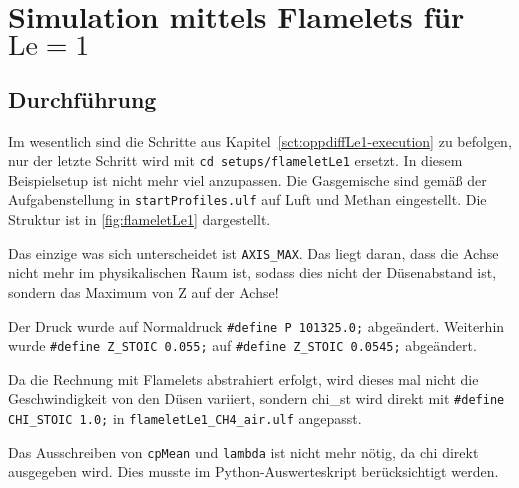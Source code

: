 
\section{Simulation mittels Flamelets für \texorpdfstring{$\mathrm{Le}=1$}{Le=1}}
\label{sct:flameletLe=1}

\subsection{Durchführung}
\label{sct:flameletLe1-execution}

\begin{sloppypar} %
Im wesentlich sind die Schritte aus Kapitel~\ref{sct:oppdiffLe1-execution} zu befolgen, nur der letzte Schritt wird mit \lstinline!cd setups/flameletLe1! ersetzt. In diesem Beispielsetup ist nicht mehr viel anzupassen. Die Gasgemische sind gemäß der Aufgabenstellung in \lstinline!startProfiles.ulf! auf Luft und Methan eingestellt. Die Struktur ist in \autoref{fig:flameletLe1} dargestellt.
\end{sloppypar}

Das einzige was sich unterscheidet ist \lstinline!AXIS_MAX!. Das liegt daran, dass die Achse nicht mehr im physikalischen Raum ist, sodass dies nicht der Düsenabstand ist, sondern das Maximum von \gls{Z} auf der Achse!

Der Druck wurde auf Normaldruck \lstinline!#define P 101325.0;! abgeändert. Weiterhin wurde \lstinline!#define Z_STOIC 0.055;! auf \lstinline!#define Z_STOIC 0.0545;! abgeändert.

Da die Rechnung mit Flamelets abstrahiert erfolgt, wird dieses mal nicht die Geschwindigkeit von den Düsen variiert, sondern \gls{chi_st} wird direkt mit \lstinline!#define CHI_STOIC 1.0;! in \lstinline!flameletLe1_CH4_air.ulf! angepasst.

Das Ausschreiben von \lstinline!cpMean! und \lstinline!lambda! ist nicht mehr nötig, da \gls{chi} direkt ausgegeben wird. Dies musste im Python-Auswerteskript berücksichtigt werden.

